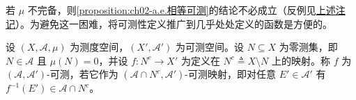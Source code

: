 \documentclass[../../main.tex]{subfiles}%
\begin{document}
若 $\mu$ 不完备，则\cref{proposition:ch02-a.e.相等可测}的结论不必成立（反例见\hyperref[remark:ch02-a.e.相等]{上述注记}）。为避免这一困难，将可测性定义推广到几乎处处定义的函数是方便的。

\begin{definition}\label{definition:ch02-a.e.可测函数}\label{definition:ch02-几乎处处可测}
设 $(X,\mathscr A,\mu)$ 为测度空间，$(X',\mathscr A')$ 为可测空间。设 $N\subseteq X$ 为零测集，即 $N\in\mathscr A$ 且 $\mu(N)=0$，并设 $f:N^c\to X'$ 为定义在 $N^c\triangleq X\setminus N$ 上的映射。称 $f$ 为 $(\mathscr A,\mathscr A')$-可测，若它作为 $(\mathscr A\cap N^c,\mathscr A')$-可测映射，即对任意 $E'\in\mathscr A'$ 有 $f^{-1}(E')\in\mathscr A\cap N^c$。
\end{definition}

\end{document}
